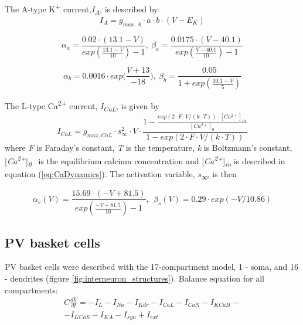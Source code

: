 \documentclass[a4paper,12pt]{article}
\begin{document}
The A-type K\textsuperscript{+} current,\textit{I\textsubscript{A}}, is described by 
\begin{equation}
I_A=g_{max, A} \cdot a \cdot b  \cdot (V-E_K)
\end{equation}

\begin{equation}
\alpha_a=\frac{0.02\cdot (13.1-V)}{exp(\frac{13.1-V}{10})-1}, \ 
\beta_a=\frac{0.0175  \cdot(V-40.1)}{exp(\frac{V-40.1}{10})-1}
\end{equation}

\begin{equation}
\alpha_b = 0.0016 \cdot exp \Big(\frac{V + 13}{-18} \Big), \  \beta_b=\frac{0.05}{1+exp(\frac{10.1-V}{5})}
\end{equation}

The L-type Ca\textsuperscript{2+} current, \textit{I\textsubscript{CaL}}, is given by
\begin{equation}
I_{CaL}=g_{max, CaL}\cdot s_{\infty }^2\cdot V \cdot
\frac{1-\frac{exp(2 \cdot F \cdot V/ (k \cdot T)) \cdot [Ca^{2+}]_{in}}{[Ca^{2+}]_{0}}} {1-exp(2 \cdot F \cdot V/(k \cdot T))} 
\end{equation}
where \textit{F} is Faraday’s constant, \textit{T} is the temperature, \textit{k} is
Boltzmann’s constant, [\textit{Ca\textsuperscript{2+}}]\textit{\textsubscript{0}} \ is the equilibrium calcium concentration and [\textit{Ca\textsuperscript{2+}}]\textit{\textsubscript{in}} is
described in equation (\ref{eq:CaDynamics}). The activation variable, \textit{s\textsubscript{∞}}, is then


\begin{equation}
\alpha_s(V) = \frac{15.69\cdot(-V+81.5)}{exp(\frac{-V+81.5}{10})-1} , \ \  
\beta_s(V )= 0.29\cdot exp(-V/10.86)
\end{equation}


\subsection{PV basket cells}
PV basket cells were described with the 17-compartment model, 1 - soma, and 16 - dendrites (figure \ref{fig:interneuron_structures}). Balance equation for all compartments:
\begin{eqnarray}
C\frac{dV}{dt}=-I_L-I_{Na}-I_{Kdr}-I_{CaL}-I_{CaN}-I_{KCaB}- \nonumber \\ 
-I_{KCaS}-I_{KA} -I_{syn} + I_{ext}
\end{eqnarray}
\end{document}
